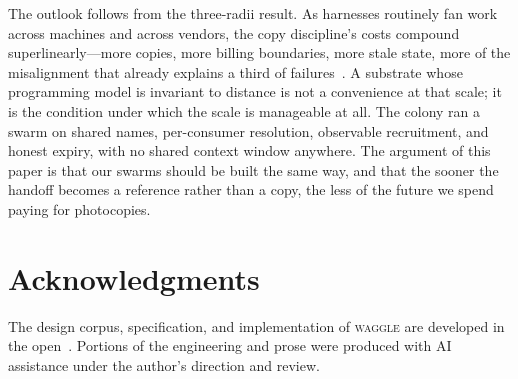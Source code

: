 \documentclass[10pt,twocolumn]{article}
\begin{document}
The outlook follows from the three-radii result. As harnesses routinely
fan work across machines and across vendors, the copy discipline's costs
compound superlinearly---more copies, more billing boundaries, more stale
state, more of the misalignment that already explains a third of
failures~\citep{cemri2025}. A substrate whose programming model is
invariant to distance is not a convenience at that scale; it is the
condition under which the scale is manageable at all. The colony ran a
swarm on shared names, per-consumer resolution, observable recruitment, and
honest expiry, with no shared context window anywhere. The argument of
this paper is that our swarms should be built the same way, and that the
sooner the handoff becomes a reference rather than a copy, the less of the
future we spend paying for photocopies.

\section*{Acknowledgments}
The design corpus, specification, and implementation of \textsc{waggle}
are developed in the open~\citep{waggle2026}. Portions of the engineering
and prose were produced with AI assistance under the author's direction
and review.

\balance
{\small


}
\end{document}
